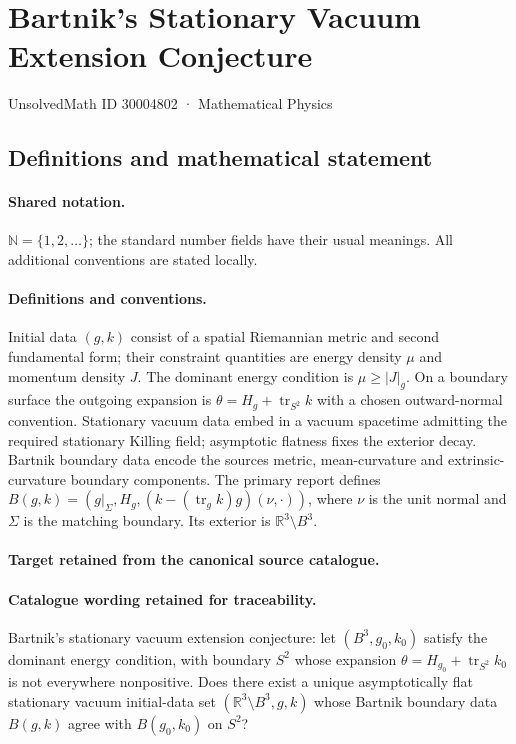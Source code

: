 \documentclass[11pt]{article}
\begin{document}
\setcounter{section}{30004801}
\section{Bartnik’s Stationary Vacuum Extension Conjecture}\label{30004802}
{\small UnsolvedMath ID 30004802 · Mathematical Physics}
\subsection{Definitions and mathematical statement}

\paragraph{Shared notation.}$\mathbb N=\{1,2,\ldots\}$; the standard number fields have their usual meanings. All additional conventions are stated locally.


\paragraph{Definitions and conventions.}
Initial data $(g,k)$ consist of a spatial Riemannian metric and second fundamental form; their constraint quantities are energy density $\mu$ and momentum density $J$. The dominant energy condition is $\mu\geq|J|_g$. On a boundary surface the outgoing expansion is $\theta=H_g+\operatorname{tr}_{S^2}k$ with a chosen outward-normal convention. Stationary vacuum data embed in a vacuum spacetime admitting the required stationary Killing field; asymptotic flatness fixes the exterior decay. Bartnik boundary data encode the source\textquotesingle s metric, mean-curvature and extrinsic-curvature boundary components. The primary report defines $B(g,k)=(g|_\Sigma,H_g,(k-(\operatorname{tr}_gk)g)(\nu,\cdot))$, where $\nu$ is the unit normal and $\Sigma$ is the matching boundary. Its exterior is $\mathbb R^3\setminus B^3$.

\paragraph{Target retained from the canonical source catalogue.}
\paragraph{Catalogue wording retained for traceability.}
Bartnik's stationary vacuum extension conjecture: let $(B^3,g_0,k_0)$ satisfy the dominant energy condition, with boundary $S^2$ whose expansion $\theta=H_{g_0}+\operatorname{tr}_{S^2}k_0$ is not everywhere nonpositive. Does there exist a unique asymptotically flat stationary vacuum initial-data set $(\mathbb{R}^3\setminus B^3,g,k)$ whose Bartnik boundary data $B(g,k)$ agree with $B(g_0,k_0)$ on $S^2$?
\end{document}
